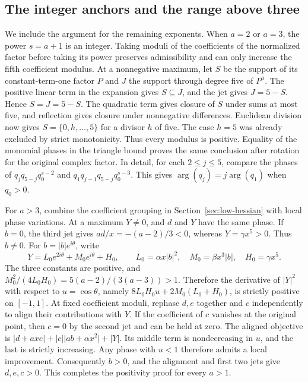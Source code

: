 \documentclass[11pt]{article}
\begin{document}
\subsection{The integer anchors and the range above three}

We include the argument for the remaining exponents. When \(a=2\)
or \(a=3\), the power \(s=a+1\) is an integer. Taking moduli of
the coefficients of the normalized factor before taking its
power preserves admissibility and can only increase the fifth
coefficient modulus. At a nonnegative maximum, let \(S\) be
the support of its constant-term-one factor \(P\) and \(J\)
the support through degree five of \(P^a\). The positive
linear term in the expansion gives \(S\subseteq J\), and the
jet gives \(J=5-S\). Hence \(S=J=5-S\). The quadratic term
gives closure of \(S\) under sums at most five, and reflection
gives closure under nonnegative differences. Euclidean division
now gives \(S=\{0,h,\ldots,5\}\) for a divisor \(h\) of five.
The case \(h=5\) was already excluded by strict monotonicity.
Thus every modulus is positive. Equality of the monomial
phases in the triangle bound proves the same conclusion after
rotation for the original complex factor. In detail, for each
\(2\le j\le5\), compare the phases of
\(q_jq_{5-j}q_0^{s-2}\) and \(q_1q_{j-1}q_{5-j}q_0^{s-3}\).
This gives \(\arg(q_j)=j\arg(q_1)\) when \(q_0>0\).

For \(a>3\), combine the coefficient grouping in
Section~\ref{sec:low-hessian} with local phase variations.
At a maximum \(Y\ne0\), and \(d\) and \(Y\) have the same phase.
If \(b=0\), the third jet gives \(ad/x=-(a-2)/3<0\), whereas
\(Y=\gamma x^5>0\). Thus \(b\ne0\).
For \(b=|b|e^{i\theta}\), write
\[
 Y=L_0e^{2i\theta}+M_0e^{i\theta}+H_0,\qquad
 L_0=\alpha x|b|^2,\quad M_0=\beta x^3|b|,\quad
 H_0=\gamma x^5.
\]
The three constants are positive, and
\(M_0^2/(4L_0H_0)=5(a-2)/(3(a-3))>1\).
Therefore the derivative of \(|Y|^2\) with respect to
\(u=\cos\theta\), namely \(8L_0H_0u+2M_0(L_0+H_0)\), is
strictly positive on \([-1,1]\).
At fixed coefficient moduli, rephase \(d,e\) together and \(c\)
independently to align their contributions with \(Y\).
If the coefficient of \(c\) vanishes at the original point,
then \(c=0\) by the second jet and can be held at zero.
The aligned objective is
\(\lvert d+axe\rvert+|c|\lvert ab+\alpha x^2\rvert+|Y|\).
Its middle term is nondecreasing in \(u\), and the last is
strictly increasing. Any phase with \(u<1\) therefore admits a
local improvement. Consequently \(b>0\), and the alignment
and first two jets give \(d,e,c>0\).
This completes the positivity proof for every \(a>1\).
\end{document}

